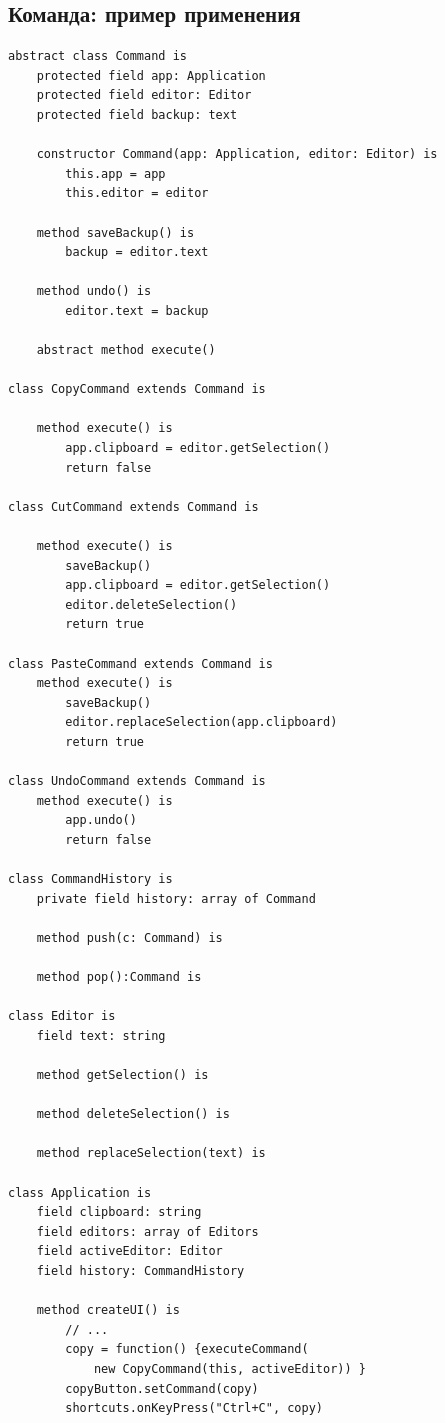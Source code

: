 \subsection{Команда: пример применения}
\begin{lstlisting}
abstract class Command is
    protected field app: Application
    protected field editor: Editor
    protected field backup: text

    constructor Command(app: Application, editor: Editor) is
        this.app = app
        this.editor = editor

    method saveBackup() is
        backup = editor.text

    method undo() is
        editor.text = backup

    abstract method execute()

class CopyCommand extends Command is

    method execute() is
        app.clipboard = editor.getSelection()
        return false

class CutCommand extends Command is

    method execute() is
        saveBackup()
        app.clipboard = editor.getSelection()
        editor.deleteSelection()
        return true

class PasteCommand extends Command is
    method execute() is
        saveBackup()
        editor.replaceSelection(app.clipboard)
        return true

class UndoCommand extends Command is
    method execute() is
        app.undo()
        return false

class CommandHistory is
    private field history: array of Command

    method push(c: Command) is

    method pop():Command is

class Editor is
    field text: string

    method getSelection() is

    method deleteSelection() is

    method replaceSelection(text) is

class Application is
    field clipboard: string
    field editors: array of Editors
    field activeEditor: Editor
    field history: CommandHistory

    method createUI() is
        // ...
        copy = function() {executeCommand(
            new CopyCommand(this, activeEditor)) }
        copyButton.setCommand(copy)
        shortcuts.onKeyPress("Ctrl+C", copy)


\end{lstlisting}
